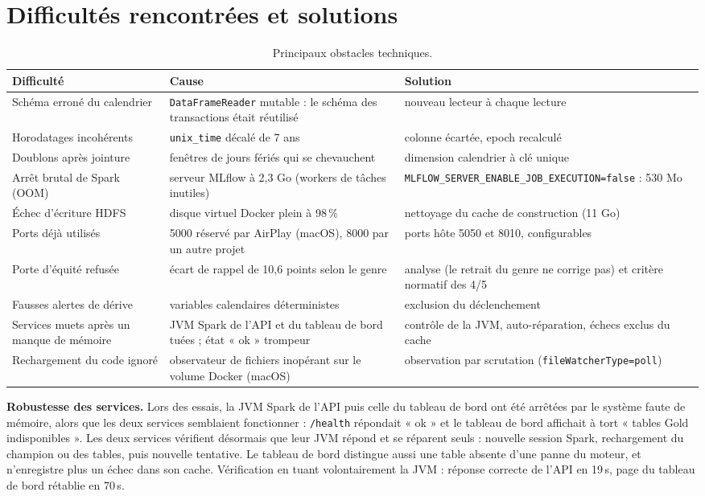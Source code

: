 \documentclass[11pt,a4paper]{article}
\newcommand{\code}[1]{\texttt{\small #1}}
\begin{document}
\clearpage
\section{Difficultés rencontrées et solutions}
\begin{table}[H]
\centering\small
\begin{tabularx}{\linewidth}{@{}l Y Y@{}}
\toprule
\textbf{Difficulté} & \textbf{Cause} & \textbf{Solution} \\ \midrule
Schéma erroné du calendrier & \code{DataFrameReader} mutable : le schéma des transactions était réutilisé & nouveau lecteur à chaque lecture \\
Horodatages incohérents & \code{unix\_time} décalé de 7 ans & colonne écartée, epoch recalculé \\
Doublons après jointure & fenêtres de jours fériés qui se chevauchent & dimension calendrier à clé unique \\
Arrêt brutal de Spark (OOM) & serveur MLflow à 2,3 Go (workers de tâches inutiles) & \code{MLFLOW\_SERVER\_ENABLE\_JOB\_EXECUTION=false} : 530 Mo \\
Échec d'écriture HDFS & disque virtuel Docker plein à 98\,\% & nettoyage du cache de construction (11 Go) \\
Ports déjà utilisés & 5000 réservé par AirPlay (macOS), 8000 par un autre projet & ports hôte 5050 et 8010, configurables \\
Porte d'équité refusée & écart de rappel de 10,6 points selon le genre & analyse (le retrait du genre ne corrige pas) et critère normatif des 4/5 \\
Fausses alertes de dérive & variables calendaires déterministes & exclusion du déclenchement \\
Services muets après un manque de mémoire & JVM Spark de l'API et du tableau de bord tuées ; état « ok » trompeur & contrôle de la JVM, auto-réparation, échecs exclus du cache \\
Rechargement du code ignoré & observateur de fichiers inopérant sur le volume Docker (macOS) & observation par scrutation (\code{fileWatcherType=poll}) \\
\bottomrule
\end{tabularx}
\caption{Principaux obstacles techniques.}
\end{table}

\textbf{Robustesse des services.} Lors des essais, la JVM Spark de l'API puis celle du tableau de bord ont été arrêtées par le
système faute de mémoire, alors que les deux services semblaient fonctionner : \code{/health} répondait « ok » et le tableau de bord
affichait à tort « tables Gold indisponibles ». Les deux services vérifient désormais que leur JVM répond et se réparent seuls :
nouvelle session Spark, rechargement du champion ou des tables, puis nouvelle tentative. Le tableau de bord distingue aussi une table
absente d'une panne du moteur, et n'enregistre plus un échec dans son cache. Vérification en tuant volontairement la JVM : réponse
correcte de l'API en 19\,s, page du tableau de bord rétablie en 70\,s.
\end{document}

